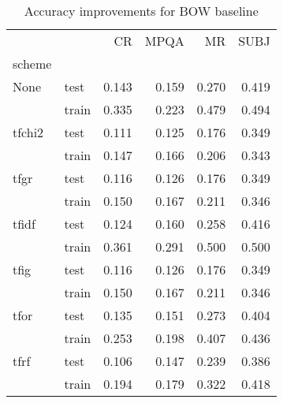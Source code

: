     
    \begin{table}[H]
    \begin{center}
    
    \begin{tabular}{llrrrr}
    \toprule
    {} &      &  CR &  MPQA &  MR &  SUBJ \\
    scheme &  &            &              &            &              \\
    \midrule
    None & test &      0.143 &        0.159 &      0.270 &        0.419 \\
    {} & train &      0.335 &        0.223 &      0.479 &        0.494 \\
    tfchi2 & test &      0.111 &        0.125 &      0.176 &        0.349 \\
    {} & train &      0.147 &        0.166 &      0.206 &        0.343 \\
    tfgr & test &      0.116 &        0.126 &      0.176 &        0.349 \\
    {} & train &      0.150 &        0.167 &      0.211 &        0.346 \\
    tfidf & test &      0.124 &        0.160 &      0.258 &        0.416 \\
    {} & train &      0.361 &        0.291 &      0.500 &        0.500 \\
    tfig & test &      0.116 &        0.126 &      0.176 &        0.349 \\
    {} & train &      0.150 &        0.167 &      0.211 &        0.346 \\
    tfor & test &      0.135 &        0.151 &      0.273 &        0.404 \\
    {} & train &      0.253 &        0.198 &      0.407 &        0.436 \\
    tfrf & test &      0.106 &        0.147 &      0.239 &        0.386 \\
    {} & train &      0.194 &        0.179 &      0.322 &        0.418 \\
    \bottomrule
    \end{tabular}
    
    \caption[Accuracy improvements for BOW baseline]{Accuracy improvements for BOW baseline}
    \label{tab:}
    \end{center}
    \end{table}
    
